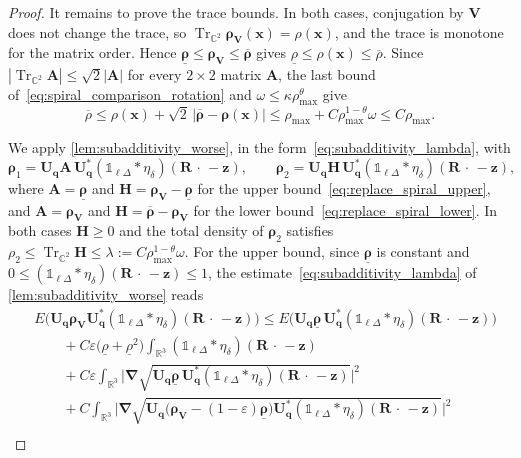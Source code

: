 \documentclass[final,reqno]{amsart}
\theoremstyle{remark}
\renewcommand{\le}{\leqslant}
\renewcommand{\ge}{\geqslant}
\renewcommand{\epsilon}{\varepsilon}
\newcommand{\ol}[1]{\overline{#1}}
\newcommand{\ul}[1]{\underline{#1}}
\DeclareMathOperator{\Tr}{Tr}
\newcommand{\Trs}{\Tr_{\CC^2}}
\newcommand{\RR}{\mathbb{R}}
\newcommand{\CC}{\mathbb{C}}
\newcommand{\iden}{\mathbb{1}}
\newcommand{\grad}{\bm{\nabla}}
\newcommand{\tetra}{\mathbb{\Delta}}
\begin{document}
\begin{proof}
It remains to prove the trace bounds. In both cases, conjugation by $\mathbf{V}$ does not change the trace, so $\Trs\bm{\rho}_{\mathbf{V}}(\mathbf{x})=\rho(\mathbf{x})$, and the trace is monotone for the matrix order. Hence $\ul{\bm{\rho}}\le\bm{\rho}_{\mathbf{V}}\le\ol{\bm{\rho}}$ gives $\ul{\rho}\le\rho(\mathbf{x})\le\ol{\rho}$. Since $|\Trs\mathbf{A}|\le\sqrt2|\mathbf{A}|$ for every $2\times2$ matrix $\mathbf{A}$, the last bound of~\cref{eq:spiral_comparison_rotation} and $\omega\le\kappa\rho_{\max}^\theta$ give
\[
\ol{\rho}\le\rho(\mathbf{x})+\sqrt2\,|\ol{\bm{\rho}}-\bm{\rho}(\mathbf{x})|\le\rho_{\max}+C\rho_{\max}^{1-\theta}\omega\le C\rho_{\max}.
\]

We apply \cref{lem:subadditivity_worse}, in the form~\cref{eq:subadditivity_lambda}, with
$$
\bm{\rho}_1=\mathbf{U}_{\mathbf{q}}\mathbf{A}\,\mathbf{U}_{\mathbf{q}}^*(\iden_{\ell\tetra}\ast\eta_\delta)(\mathbf{R}\,\cdot\,-\mathbf{z}),\qquad
\bm{\rho}_2=\mathbf{U}_{\mathbf{q}}\mathbf{H}\,\mathbf{U}_{\mathbf{q}}^*(\iden_{\ell\tetra}\ast\eta_\delta)(\mathbf{R}\,\cdot\,-\mathbf{z}),
$$
where $\mathbf{A}=\ul{\bm{\rho}}$ and $\mathbf{H}=\bm{\rho}_{\mathbf{V}}-\ul{\bm{\rho}}$ for the upper bound~\cref{eq:replace_spiral_upper}, and $\mathbf{A}=\bm{\rho}_{\mathbf{V}}$ and $\mathbf{H}=\ol{\bm{\rho}}-\bm{\rho}_{\mathbf{V}}$ for the lower bound~\cref{eq:replace_spiral_lower}. In both cases $\mathbf{H}\ge0$ and the total density of $\bm{\rho}_2$ satisfies $\rho_2\le\Trs\mathbf{H}\le\lambda:=C\rho_{\max}^{1-\theta}\omega$. For the upper bound, since $\ul{\bm{\rho}}$ is constant and $0\le(\iden_{\ell\tetra}\ast\eta_\delta)(\mathbf{R}\,\cdot\,-\mathbf{z})\le1$, the estimate~\cref{eq:subadditivity_lambda} of \cref{lem:subadditivity_worse} reads
\begin{align*}
&E\big(\mathbf{U}_{\mathbf{q}}\bm{\rho}_{\mathbf{V}}\mathbf{U}_{\mathbf{q}}^*(\iden_{\ell\tetra}\ast\eta_\delta)(\mathbf{R}\,\cdot\,-\mathbf{z})\big)\le E\big(\mathbf{U}_{\mathbf{q}}\ul{\bm{\rho}}\,\mathbf{U}_{\mathbf{q}}^*(\iden_{\ell\tetra}\ast\eta_\delta)(\mathbf{R}\,\cdot\,-\mathbf{z})\big)\\
&\qquad+C\epsilon\big(\ul{\rho}+\ul{\rho}^2\big)\int_{\RR^3}(\iden_{\ell\tetra}\ast\eta_\delta)(\mathbf{R}\,\cdot\,-\mathbf{z})\\
&\qquad+C\epsilon\int_{\RR^3}\Big|\grad\sqrt{\mathbf{U}_{\mathbf{q}}\ul{\bm{\rho}}\,\mathbf{U}_{\mathbf{q}}^*(\iden_{\ell\tetra}\ast\eta_\delta)(\mathbf{R}\,\cdot\,-\mathbf{z})}\Big|^2\\
&\qquad+C\int_{\RR^3}\Big|\grad\sqrt{\mathbf{U}_{\mathbf{q}}\big(\bm{\rho}_{\mathbf{V}}-(1-\epsilon)\ul{\bm{\rho}}\big)\mathbf{U}_{\mathbf{q}}^*(\iden_{\ell\tetra}\ast\eta_\delta)(\mathbf{R}\,\cdot\,-\mathbf{z})}\Big|^2\\

\end{align*}
\end{proof}
\end{document}
